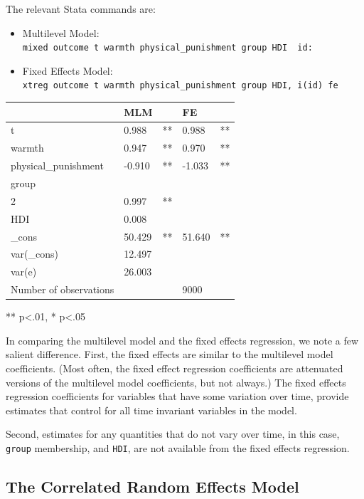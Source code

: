 \documentclass[
  letterpaper,
  DIV=11,
  numbers=noendperiod]{scrreprt}
\providecommand{\tightlist}{%
  \setlength{\itemsep}{0pt}\setlength{\parskip}{0pt}}\usepackage{longtable,booktabs,array}
\begin{document}
The relevant Stata commands are:

\begin{itemize}
\tightlist
\item
  Multilevel Model:
  \texttt{mixed\ outcome\ t\ warmth\ physical\_punishment\ group\ HDI\ \textbar{}\textbar{}\ id:}
\item
  Fixed Effects Model:
  \texttt{xtreg\ outcome\ t\ warmth\ physical\_punishment\ group\ HDI,\ i(id)\ fe}
\end{itemize}

\begin{longtable}[]{@{}lllll@{}}
\toprule()
& MLM & & FE & \\
\midrule()
\endhead
t & 0.988 & ** & 0.988 & ** \\
warmth & 0.947 & ** & 0.970 & ** \\
physical\_punishment & -0.910 & ** & -1.033 & ** \\
group & & & & \\
2 & 0.997 & ** & & \\
HDI & 0.008 & & & \\
\_cons & 50.429 & ** & 51.640 & ** \\
var(\_cons) & 12.497 & & & \\
var(e) & 26.003 & & & \\
Number of observations & & & 9000 & \\
\bottomrule()
\end{longtable}

** p\textless.01, * p\textless.05

In comparing the multilevel model and the fixed effects regression, we
note a few salient difference. First, the fixed effects are similar to
the multilevel model coefficients. (Most often, the fixed effect
regression coefficients are attenuated versions of the multilevel model
coefficients, but not always.) The fixed effects regression coefficients
for variables that have some variation over time, provide estimates that
control for all time invariant variables in the model.

Second, estimates for any quantities that do not vary over time, in this
case, \texttt{group} membership, and \texttt{HDI}, are not available
from the fixed effects regression.

\hypertarget{the-correlated-random-effects-model}{%
\subsection{The Correlated Random Effects
Model}\label{the-correlated-random-effects-model}}
\end{document}
